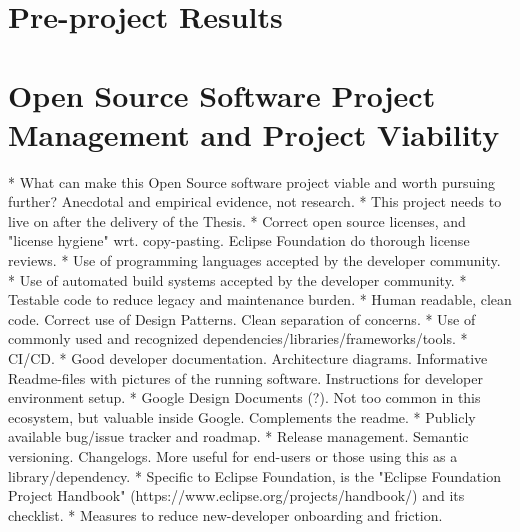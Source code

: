\section{Pre-project Results}




\section{Open Source Software Project Management and Project Viability}

* What can make this Open Source software project viable and worth pursuing further? Anecdotal and empirical evidence, not research.
  * This project needs to live on after the delivery of the Thesis.
  * Correct open source licenses, and "license hygiene" wrt. copy-pasting. Eclipse Foundation do thorough license reviews.
  * Use of programming languages accepted by the developer community.
  * Use of automated build systems accepted by the developer community.
  * Testable code to reduce legacy and maintenance burden.
  * Human readable, clean code. Correct use of Design Patterns. Clean separation of concerns.
  * Use of commonly used and recognized dependencies/libraries/frameworks/tools.
  * CI/CD.
  * Good developer documentation. Architecture diagrams. Informative Readme-files with pictures of the running software. Instructions for developer environment setup.
  * Google Design Documents (?). Not too common in this ecosystem, but valuable inside Google. Complements the readme.
  * Publicly available bug/issue tracker and roadmap.
  * Release management. Semantic versioning. Changelogs. More useful for end-users or those using this as a library/dependency.
  * Specific to Eclipse Foundation, is the "Eclipse Foundation Project Handbook" (https://www.eclipse.org/projects/handbook/) and its checklist.
  * Measures to reduce new-developer onboarding and friction.
